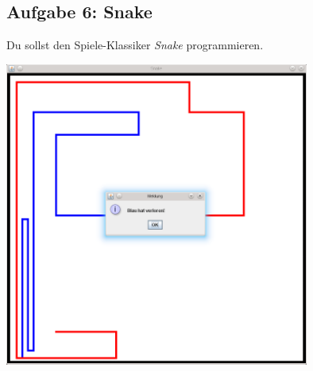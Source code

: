 \subsection{Aufgabe 6: Snake}

Du sollst den Spiele-Klassiker \emph{Snake} programmieren.

\begin{center}
\includegraphics[width=0.75\textwidth]{./inf/SEKII/22_Java_Mausereignisse/Snake.png}
\end{center}

